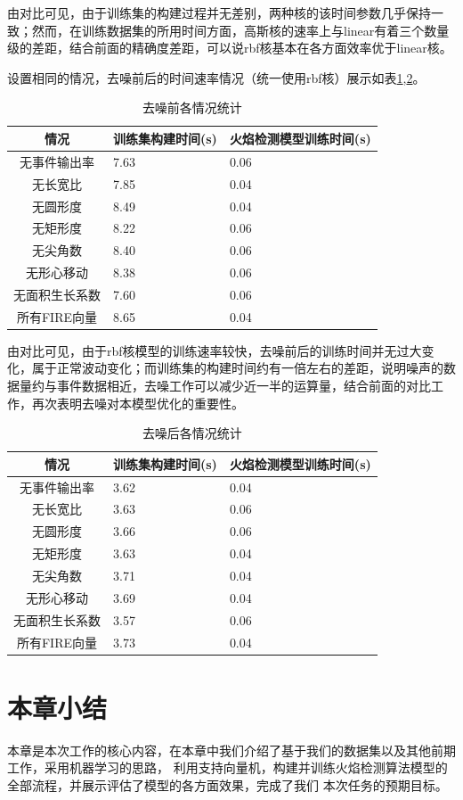 由对比可见，由于训练集的构建过程并无差别，两种核的该时间参数几乎保持一致；然而，在训练数据集的所用时间方面，高斯核的速率上与linear有着三个数量级的差距，结合前面的精确度差距，可以说rbf核基本在各方面效率优于linear核。

设置相同的情况，去噪前后的时间速率情况（统一使用rbf核）展示如表\ref{t_噪前},\ref{t_噪后}。
\begin{table}[ht]
    \centering
    \caption{去噪前各情况统计}
    \begin{tabularx}{0.7\textwidth}{c|X|X}
        \toprule
        情况&训练集构建时间(s)&火焰检测模型训练时间(s)\\
        \midrule
        无事件输出率&7.63&0.06\\
        无长宽比&7.85&0.04\\
        无圆形度&8.49&0.04\\
        无矩形度&8.22&0.06\\
        无尖角数&8.40&0.06\\
        无形心移动&8.38&0.06\\
        无面积生长系数&7.60&0.06\\
        所有FIRE向量&8.65&0.04\\
        \bottomrule
    \end{tabularx}
    \label{t_噪前}
\end{table}



由对比可见，由于rbf核模型的训练速率较快，去噪前后的训练时间并无过大变化，属于正常波动变化；而训练集的构建时间约有一倍左右的差距，说明噪声的数据量约与事件数据相近，去噪工作可以减少近一半的运算量，结合前面的对比工作，再次表明去噪对本模型优化的重要性。
\begin{table}[ht]
    \centering
    \caption{去噪后各情况统计}
    \begin{tabularx}{0.7\textwidth}{c|X|X}
        \toprule
        情况&训练集构建时间(s)&火焰检测模型训练时间(s)\\
        \midrule
        无事件输出率&3.62&0.04\\
        无长宽比&3.63&0.06\\
        无圆形度&3.66&0.06\\
        无矩形度&3.63&0.04\\
        无尖角数&3.71&0.04\\
        无形心移动&3.69&0.04\\
        无面积生长系数&3.57&0.06\\
        所有FIRE向量&3.73&0.04\\
        \bottomrule
    \end{tabularx}
    \label{t_噪后}
\end{table}















\section{本章小结}
本章是本次工作的核心内容，在本章中我们介绍了基于我们的数据集以及其他前期工作，采用机器学习的思路，
利用支持向量机，构建并训练火焰检测算法模型的全部流程，并展示评估了模型的各方面效果，完成了我们
本次任务的预期目标。